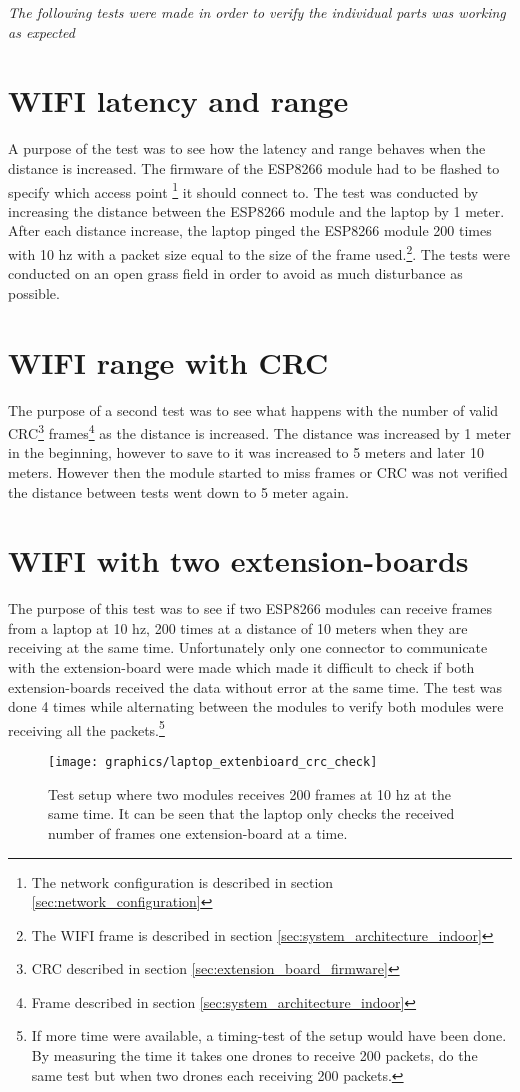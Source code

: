 \textit{The following tests were made in order to verify the individual parts was working as expected}


\section{WIFI latency and range} \label{sec:test_wifi_range_ping}
A purpose of the test was to see how the latency and range behaves when the distance is increased.
The firmware of the ESP8266 module had to be flashed to specify which access point \footnote{The network configuration is described in section \ref{sec:network_configuration}} it should connect to.
The test was conducted by increasing the distance between the ESP8266 module and the laptop by 1 meter. After each distance increase, the laptop pinged the ESP8266 module 200 times with 10 hz with a packet size equal to the size of the frame used.\footnote{The WIFI frame is described in section \ref{sec:system_architecture_indoor}}. 
The tests were conducted on an open grass field in order to avoid as much disturbance as possible.


\section{WIFI range with CRC} \label{sec:test_wifi_range_crc}
The purpose of a second test was to see what happens with the number of valid CRC\footnote{CRC described in section \ref{sec:extension_board_firmware}} frames\footnote{Frame described in section \ref{sec:system_architecture_indoor}} as the distance is increased.
The distance was increased by 1 meter in the beginning, however to save to it was increased to 5 meters and later 10 meters. However then the module started to miss frames or CRC was not verified the distance between tests went down to 5 meter again.


\section{WIFI with two extension-boards}
The purpose of this test was to see if two ESP8266 modules can receive frames from a laptop at 10 hz, 200 times at a distance of 10 meters when they are receiving at the same time.
Unfortunately only one connector to communicate with the extension-board were made which made it difficult to check if both extension-boards received the data without error at the same time. The test was done 4 times while alternating between the modules to verify both modules were receiving all the packets.\footnote{If more time were available, a timing-test of the setup would have been done. By measuring the time it takes one drones to receive 200 packets, do the same test but when two drones each receiving 200 packets.}

\begin{figure}[H]
    \centering
        \texttt{[image: graphics/laptop\_extenbioard\_crc\_check]}
        \caption{Test setup where two modules receives 200 frames at 10 hz at the same time. It can be seen that the laptop only checks the received number of frames one extension-board at a time.}
        \label{fig:wifi_two_modules_check}
\end{figure}